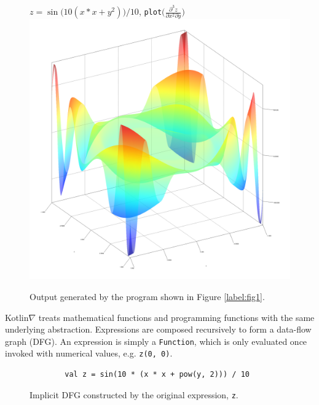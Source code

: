 \documentclass[12pt,initial,twoside,maitrise]{dms}
\numberwithin{equation}{section}
\numberwithin{table}{chapter}
\numberwithin{figure}{chapter}
\begin{document}
\begin{figure}[!htb]
    \centering $z = \sin{\big(10(x*x + y^2)\big)} / 10$, \texttt{plot}$\Big(\frac{\partial^3z}{\partial{x^2}\partial{y}}\Big)$
    \includegraphics[scale=0.43]{plot_result.png}
    \caption{Output generated by the program shown in Figure \ref{label:fig1}.}
\end{figure}

Kotlin$\nabla$ treats mathematical functions and programming functions with the same underlying abstraction. Expressions are composed recursively to form a data-flow graph (DFG). An expression is simply a \texttt{Function}, which is only evaluated once invoked with numerical values, e.g. \texttt{z(0, 0)}.

\begin{figure}[!htb]
    \begin{verbatim}
        val z = sin(10 * (x * x + pow(y, 2))) / 10
    \end{verbatim}
    \centering
    \caption{Implicit DFG constructed by the original expression, \texttt{z}.}
\end{figure}
\end{document}
